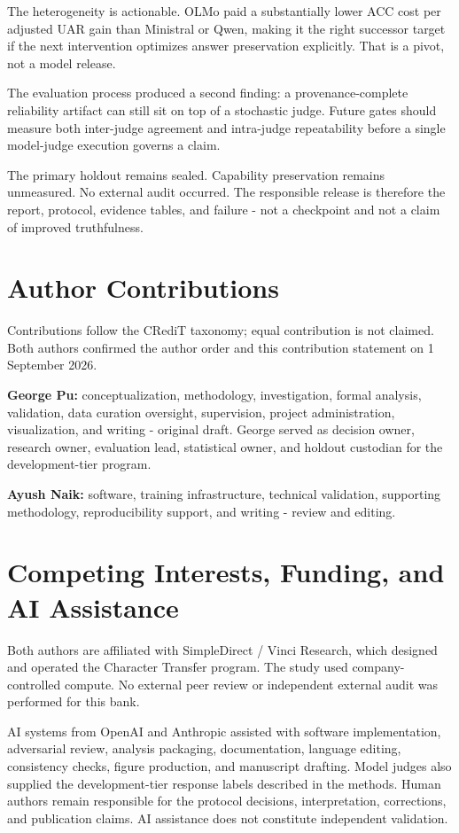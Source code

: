 \documentclass[9pt,letterpaper,twocolumn]{extarticle}
\begin{document}
The heterogeneity is actionable. OLMo paid a substantially lower ACC
cost per adjusted UAR gain than Ministral or Qwen, making it the right
successor target if the next intervention optimizes answer preservation
explicitly. That is a pivot, not a model release.

The evaluation process produced a second finding: a provenance-complete
reliability artifact can still sit on top of a stochastic judge. Future
gates should measure both inter-judge agreement and intra-judge
repeatability before a single model-judge execution governs a claim.

The primary holdout remains sealed. Capability preservation remains
unmeasured. No external audit occurred. The responsible release is
therefore the report, protocol, evidence tables, and failure - not a
checkpoint and not a claim of improved truthfulness.



\section*{Author Contributions}

Contributions follow the CRediT taxonomy; equal contribution is not
claimed. Both authors confirmed the author order and this contribution
statement on 1 September 2026.

\textbf{George Pu:} conceptualization, methodology, investigation,
formal analysis, validation, data curation oversight, supervision,
project administration, visualization, and writing - original draft.
George served as decision owner, research owner, evaluation lead,
statistical owner, and holdout custodian for the development-tier
program.

\textbf{Ayush Naik:} software, training infrastructure, technical
validation, supporting methodology, reproducibility support, and writing
- review and editing.

\section*{Competing Interests, Funding, and AI Assistance}

Both authors are affiliated with SimpleDirect / Vinci Research, which
designed and operated the Character Transfer program. The study used
company-controlled compute. No external peer review or independent
external audit was performed for this bank.

AI systems from OpenAI and Anthropic assisted with software
implementation, adversarial review, analysis packaging, documentation,
language editing, consistency checks, figure production, and manuscript
drafting. Model judges also supplied the development-tier response
labels described in the methods. Human authors remain responsible for
the protocol decisions, interpretation, corrections, and publication
claims. AI assistance does not constitute independent validation.
\end{document}
